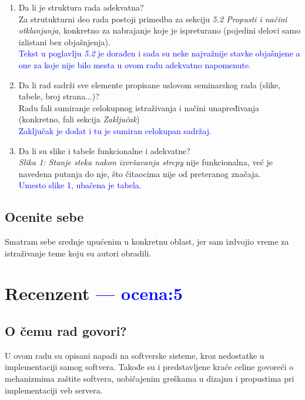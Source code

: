 \documentclass[a4paper]{report}
\newcommand{\odgovor}[1]{\textcolor{blue}{#1}}
\newcommand{\say}[1]{\textit{#1}}
\begin{document}
\begin{enumerate}
\item Da li je struktura rada adekvatna?\\
Za strutukturni deo rada postoji primedba za sekciju \say{5.2 Propusti i načini otklanjanja}, konkretno za nabrajanje koje je ispreturano (pojedini delovi samo izlistani bez objašnjenja).\\
\odgovor{ Tekst u poglavlju \say{5.2} je dorađen i sada su neke najvažnije stavke objašnjene a one za koje nije bilo mesta u ovom radu adekvatno napomenute. }
\item Da li rad sadrži sve elemente propisane uslovom seminarskog rada (slike, tabele, broj strana...)?\\
Radu fali sumiranje celokupnog istraživanja i načini unapređivanja (konkretno, fali sekcija  \say{Zaključak})\\
\odgovor{Zaključak je dodat i tu je sumiran celokupan sadržaj.}
\item Da li su slike i tabele funkcionalne i adekvatne?\\
\say{Slika 1: Stanje steka nakon izvršavanja strcpy} nije funkcionalna, već je navedena putanja do nje, što čitaocima nije od preteranog značaja.\\
\odgovor{Umesto slike 1, ubačena je tabela.}
\end{enumerate}

\section{Ocenite sebe}
Smatram sebe srednje upućenim u konkretnu oblast, jer sam izdvojio vreme za istraživanje teme koju su autori obradili.

\chapter{Recenzent \odgovor{--- ocena:5} }


\section{O čemu rad govori?}
U ovom radu su opisani napadi na softverske sisteme, kroz nedostatke u implementaciji samog softvera. Takođe su i predstavljene kraće celine govoreći o mehanizmima zaštite softvera, uobičajenim greškama u dizajnu i propustima pri implementaciji veb servera.
\end{document}
